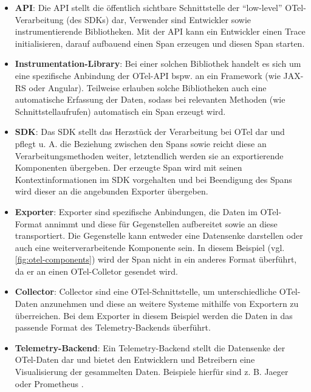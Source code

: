 \begin{itemize}
	\item \textbf{API}: Die API stellt die öffentlich sichtbare Schnittstelle der \enquote{low-level} OTel-Verarbeitung (des SDKs) dar, Verwender sind Entwickler sowie instrumentierende Bibliotheken. Mit der API kann ein Entwickler einen Trace initialisieren, darauf aufbauend einen Span erzeugen und diesen Span starten.
	
	\item \textbf{Instrumentation-Library}: Bei einer solchen Bibliothek handelt es sich um eine spezifische Anbindung der OTel-API bspw. an ein Framework (wie JAX-RS oder Angular). Teilweise erlauben solche Bibliotheken auch eine automatische Erfassung der Daten, sodass bei relevanten Methoden (wie Schnittstellaufrufen) automatisch ein Span erzeugt wird.
	
	\item \textbf{SDK}: Das SDK stellt das Herzstück der Verarbeitung bei OTel dar und pflegt u. A. die Beziehung zwischen den Spans sowie reicht diese an Verarbeitungsmethoden weiter, letztendlich werden sie an exportierende Komponenten übergeben. Der erzeugte Span wird mit seinen Kontextinformationen im SDK vorgehalten und bei Beendigung des Spans wird dieser an die angebunden Exporter übergeben.
	
	\item \textbf{Exporter}: Exporter sind spezifische Anbindungen, die Daten im OTel-Format annimmt und diese für Gegenstellen aufbereitet sowie an diese transportiert. Die Gegenstelle kann entweder eine Datensenke darstellen oder auch eine weiterverarbeitende Komponente sein. In diesem Beispiel (vgl. \autoref{fig:otel-components}) wird der Span nicht in ein anderes Format überführt, da er an einen OTel-Colletor gesendet wird.
	
	\item \textbf{Collector}: Collector sind eine OTel-Schnittstelle, um unterschiedliche OTel-Daten anzunehmen und diese an weitere Systeme mithilfe von Exportern zu überreichen. Bei dem Exporter in diesem Beispiel werden die Daten in das passende Format des Telemetry-Backends überführt.
	
	\item \textbf{Telemetry-Backend}: Ein Telemetry-Backend stellt die Datensenke der OTel-Daten dar und bietet den Entwicklern und Betreibern eine Visualisierung der gesammelten Daten. Beispiele hierfür sind z. B. Jaeger \cite{Jaeger} oder Prometheus \cite{Prometheus}.
\end{itemize}
 
